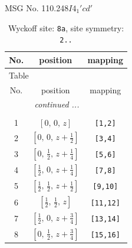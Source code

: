 \documentclass[fleqn,8pt]{jsarticle}
\begin{document}
\setcounter{MaxMatrixCols}{32}

\renewcommand{\tablename}{Table~}
\renewcommand{\figurename}{Figure~}
\begin{center}
\LARGE
MSG No. 110.248\quad$I4_{1}'cd'$
\end{center}
\renewcommand{\arraystretch}{1.2}
\begin{longtable}{ccc}
\caption{Wyckoff site: {\tt 8a}, site symmetry: {\tt 2..}}
 \\
 \hline \hline
No. & position & mapping \\ \hline \endfirsthead

\multicolumn{2}{l}{\tablename\ \thetable{}} \\
 \hline \hline
No. & position & mapping \\ \hline \endhead

 \hline \hline
\multicolumn{2}{r}{\footnotesize\it continued ...} \\ \endfoot

 \hline \hline
\multicolumn{2}{r}{} \\ \endlastfoot

1 & $\left[ 0,\, 0,\, z \right]$ & {\tt [1,2]} \\ \hline
2 & $\left[ 0,\, 0,\, z + \frac{1}{2} \right]$ & {\tt [3,4]} \\ \hline
3 & $\left[ 0,\, \frac{1}{2},\, z + \frac{1}{4} \right]$ & {\tt [5,6]} \\ \hline
4 & $\left[ \frac{1}{2},\, 0,\, z + \frac{1}{4} \right]$ & {\tt [7,8]} \\ \hline
5 & $\left[ \frac{1}{2},\, \frac{1}{2},\, z + \frac{1}{2} \right]$ & {\tt [9,10]} \\ \hline
6 & $\left[ \frac{1}{2},\, \frac{1}{2},\, z \right]$ & {\tt [11,12]} \\ \hline
7 & $\left[ \frac{1}{2},\, 0,\, z + \frac{3}{4} \right]$ & {\tt [13,14]} \\ \hline
8 & $\left[ 0,\, \frac{1}{2},\, z + \frac{3}{4} \right]$ & {\tt [15,16]} \\
\end{longtable}
\renewcommand{\arraystretch}{1.2}
\end{document}
